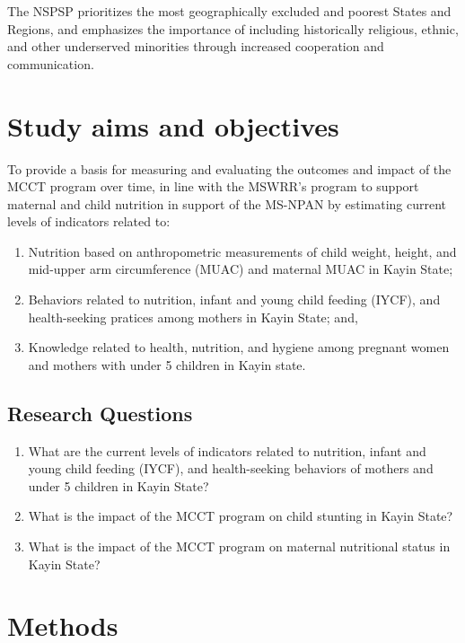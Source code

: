 \documentclass[12pt,a4paper]{article}
\begin{document}
The NSPSP prioritizes the most geographically excluded and poorest States and Regions, and emphasizes the importance of including historically religious, ethnic, and other underserved minorities through increased cooperation and communication.

\hypertarget{objectives}{%
\section{Study aims and objectives}\label{objectives}}

To provide a basis for measuring and evaluating the outcomes and impact of the MCCT program over time, in line with the MSWRR's program to support maternal and child nutrition in support of the MS-NPAN by estimating current levels of indicators related to:

\begin{enumerate}
\def\labelenumi{\arabic{enumi}.}
\item
  Nutrition based on anthropometric measurements of child weight, height, and mid-upper arm circumference (MUAC) and maternal MUAC in Kayin State;
\item
  Behaviors related to nutrition, infant and young child feeding (IYCF), and health-seeking pratices among mothers in Kayin State; and,
\item
  Knowledge related to health, nutrition, and hygiene among pregnant women and mothers with under 5 children in Kayin state.
\end{enumerate}

\hypertarget{research-questions}{%
\subsection{Research Questions}\label{research-questions}}

\begin{enumerate}
\def\labelenumi{\arabic{enumi}.}
\item
  What are the current levels of indicators related to nutrition, infant and young child feeding (IYCF), and health-seeking behaviors of mothers and under 5 children in Kayin State?
\item
  What is the impact of the MCCT program on child stunting in Kayin State?
\item
  What is the impact of the MCCT program on maternal nutritional status in Kayin State?
\end{enumerate}

\hypertarget{methods}{%
\section{Methods}\label{methods}}
\end{document}
